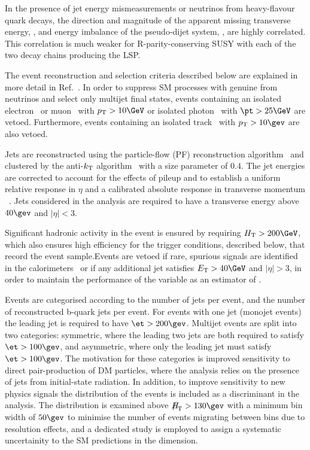 In the presence of jet energy mismeasurements or neutrinos from
heavy-flavour quark decays, the direction and magnitude of the
apparent missing transverse energy, \mht, and energy imbalance of the
pseudo-dijet system, \dht, are highly correlated. This correlation is
much weaker for R-parity-conserving SUSY with each of the two decay
chains producing the LSP.

The event reconstruction and selection criteria described below are
explained in more detail in Ref.~\cite{RA1Paper2012}.
In order to suppress SM processes with genuine \met from neutrinos and
select only multijet final states, events containing an isolated
electron~\cite{PAS-EGM-10-004} or muon~\cite{PAS-MUO-10-004} with $\Pt
> 10\GeV$ or isolated photon~\cite{PAS-EGM-10-006} with $\pt > 25\GeV$
are vetoed. Furthermore, events containing an isolated
track~\cite{single-lepton-stop} with $\Pt > 10\gev$ are also vetoed.

Jets are reconstructed using the particle-flow (PF) reconstruction
algorithm~\cite{CMS-PAS-PFT-09-001, CMS-PAS-PFT-10-001} and clustered
by the anti-$k_{\rm T}$ algorithm~\cite{antikt} with a size parameter
of $0.4$. The jet energies are corrected to account for the effects of
pileup and to establish a uniform relative response in $\eta$ and a
calibrated absolute response in transverse momentum
\pt~\cite{2011arXiv1107.4277C}. Jets considered in the analysis are
required to have a transverse energy above $40\gev$ and $|\eta| < 3$.

Significant hadronic activity in the event is ensured by requiring
$\scalht > 200\GeV$, which also ensures high efficiency for the
trigger conditions, described below, that record the event
sample.Events are vetoed if rare, spurious signals are identified in
the calorimeters~\cite{1748-0221-5-03-T03014, CMS-NOTE-2010-012} or if
any additional jet satisfies $\Et > 40\GeV$ and $|\eta| > 3$, in order
to maintain the performance of the variable \mht as an estimator of
\met.

Events are categorised according to the number of jets per event,
and the number of reconstructed b-quark jets
per event. For events with one jet (monojet events) the leading jet is required to have $\et > 200\gev$. Multijet events are split into two categories: symmetric, where the leading two jets are both required to satisfy $\et > 100\gev$, and asymmetric, where only the leading jet must satisfy $\et > 100\gev$. The motivation for these categories is improved sensitivity to direct pair-production of DM particles, where the analysis relies on the presence of jets from initial-state radiation. In addition, to improve sensitivity to new physics signals the \mht distribution of the events is included as a discriminant in the analysis. The \mht distribution is examined above $\mht > 130\gev$ with a minimum  bin width of $50\gev$ to minimise the number of events migrating between bins due to resolution effects, and a dedicated study is employed to assign a systematic uncertainity to the SM predictions in the \mht dimension.

